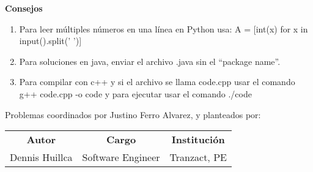 \textbf{Consejos}
\begin{enumerate}
    \item Para leer múltiples números en una línea en Python usa: A = [int(x) for x in input().split(' ')]
    \item Para soluciones en java, enviar el archivo .java sin el ``package name''.
    \item Para compilar con c++ y si el archivo se llama code.cpp usar el comando g++ code.cpp -o code y para ejecutar usar el comando ./code
\end{enumerate}

\begin{center}
    \vspace{1cm}
    Problemas coordinados por Justino Ferro Alvarez, y planteados por:
    \vspace{0.3cm}
    \begin{tabular}{ l l l}
        \multicolumn{1}{c}{\textbf{Autor}} & \multicolumn{1}{c}{\textbf{Cargo}} & \multicolumn{1}{c}{\textbf{Institución}}  \\
        Dennis Huillca & Software Engineer & Tranzact, PE\\
    \end{tabular}
\end{center}
